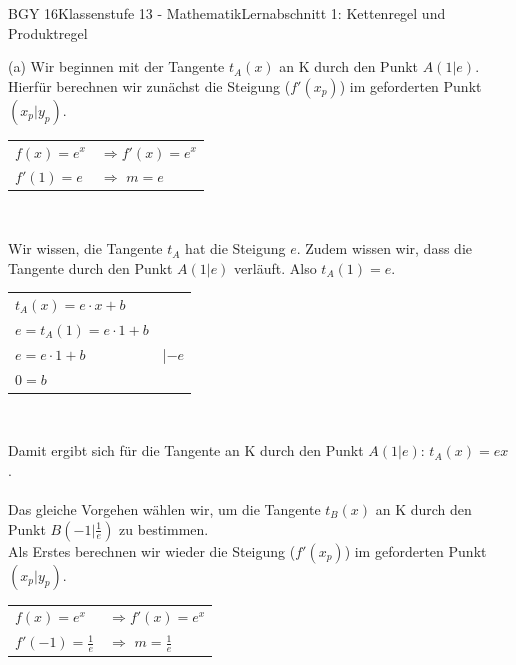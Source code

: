 \documentclass[oneside,openany,headings=optiontotoc,11pt,numbers=noenddot]{scrreprt}
\begin{document}
\begin{worksheet}{BGY 16}{Klassenstufe 13 - Mathematik}{Lernabschnitt 1: Kettenregel und Produktregel}
\begin{framed}
\begin{framed}
			\end{framed}
		 	\newpage
		 	\noindent
			(a) Wir beginnen mit der Tangente \(t_A(x)\) an K durch den Punkt \(A(1|e)\).\\
			Hierfür berechnen wir zunächst die Steigung (\(f'(x_p)\)) im geforderten Punkt \((x_p|y_p)\).\\
			\par\noindent
			\begin{tabularx}{\textwidth}{Xl}
				\(f(x) = e^x\) & \(\Rightarrow f'(x) = e^x\)\\
				\(f'(1) = e\) & \(\Rightarrow\) \colorbox{green!5}{\(m = e\)}\\
			\end{tabularx}\\
			\par\noindent
			Wir wissen, die Tangente \(t_A\) hat die Steigung \(e\). Zudem wissen wir, dass die Tangente durch den Punkt \(A(1|e)\) verläuft. Also \(t_A(1) = e\).\\
			\par\noindent
			\begin{tabularx}{\textwidth}{Xl}
				\(t_A(x) = e\cdot{}x + b\)\\
				\(e = t_A(1) = e\cdot{}1 + b\)\\
				\(e = e\cdot{}1 + b\) & |\(-e\)\\
				\colorbox{green!5}{\(0 = b\)}
			\end{tabularx}\\
			\par\noindent
			Damit ergibt sich für die Tangente an K durch den Punkt \(A(1|e)\): \colorbox{green!10}{\(t_A(x) = ex\)}.\\
			\hdashrule{\textwidth}{0.1pt}{4pt}\\
			Das gleiche Vorgehen wählen wir, um die Tangente \(t_B(x)\) an K durch den Punkt \(B(-1|\frac{1}{e})\) zu bestimmen.\\
			Als Erstes berechnen wir wieder die Steigung (\(f'(x_p)\)) im geforderten Punkt \((x_p|y_p)\).\\
			\par\noindent
			\begin{tabularx}{\textwidth}{Xl}
				\(f(x) = e^x\) & \(\Rightarrow f'(x) = e^x\)\\
				\(f'(-1) = \frac{1}{e}\) & \(\Rightarrow\) \colorbox{green!5}{\(m = \frac{1}{e}\)}\\
			\end{tabularx}\\
			\par\noindent

\end{framed}
\end{worksheet}
\end{document}
